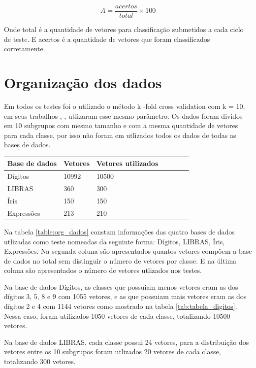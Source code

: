 $$A = \frac{acertos}{total}\times 100$$

Onde total é a quantidade de vetores para classificação submetidos a cada ciclo de teste. E acertos é a quantidade de vetores que foram classificados corretamente.

\section{Organização dos dados}
Em todos os testes foi o utilizado o método k -fold cross validation com k = 10, em seus trabalhos , ,  utlizaram esse mesmo parâmetro. Os dados foram dividos em 10 subgrupos com mesmo tamanho \cite{Guo} e com a mesma quantidade de vetores para cada classe, por isso não foram em utlizados todos os dados de todas as bases de dados.

\begin{center}
	\begin{tabular}{|l|l|l|l|p{3cm}|p{3cm}|p{2cm}|}
        \hline
        Base de dados & Vetores & Vetores utilizados\\ \hline
		Dígitos    &10992  & 10500 \\ \hline
		LIBRAS     & 360   & 300   \\ \hline
		Íris       & 150   & 150   \\ \hline
		Expressões & 213   & 210   \\ \hline
	\end{tabular}
	\label{table:org_dados}
\end{center}

Na tabela \ref{table:org_dados} constam informações das quatro bases de dados utlizadas como teste nomeadas da seguinte forma: Dígitos, LIBRAS, Íris, Expressões. Na segunda coluna são apresentados quantos vetores compõem a base de dados no total sem distinguir o número de vetores por classe. E na última coluna são apresentados o número de vetores utlizados nos testes.

Na base de dados Dígitos, as classes que possuiam menos vetores eram as dos dígitos 3, 5, 8 e 9 com 1055 vetores, e as que possuiam mais vetores eram as dos dígitos 2 e 4 com 1144 vetores como mostrado na tabela \ref{tab:tabela_digitos}. Nessa caso, foram utilizados 1050 vetores de cada classe, totalizando 10500 vetores.

Na base de dados LIBRAS, cada classe possui 24 vetores, para a distribuição dos vetores entre os 10 subgrupos foram utlizados 20 vetores de cada classe, totalizando 300 vetores.

